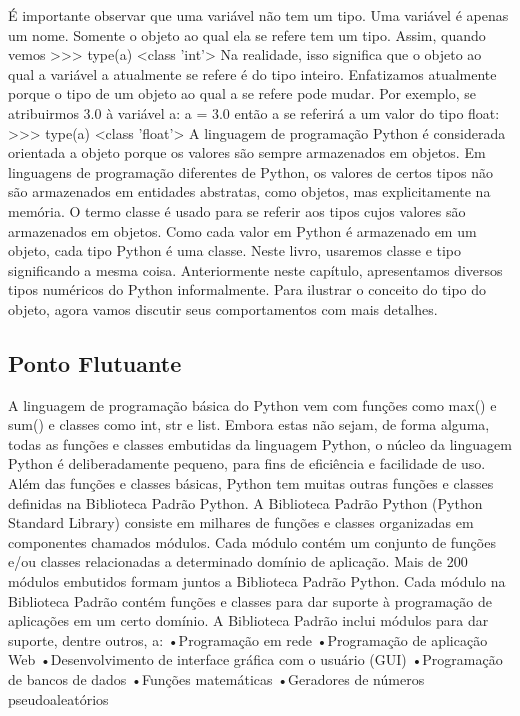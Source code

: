 			É importante observar que uma variável não tem um tipo. Uma variável é apenas
			um nome. Somente o objeto ao qual ela se refere tem um tipo. Assim, quando
			vemos
			>>> type(a)
			<class 'int'>
			Na realidade, isso significa que o objeto ao qual a variável a atualmente se refere
			é do tipo inteiro.
			Enfatizamos atualmente porque o tipo de um objeto ao qual a se refere pode
			mudar. Por exemplo, se atribuirmos 3.0 à variável a:
			a = 3.0
			então a se referirá a um valor do tipo float:
			>>> type(a)
			<class 'float'>
			A linguagem de programação Python é considerada orientada a objeto porque os valores são
			sempre armazenados em objetos. Em linguagens de programação diferentes de Python, os valores
			de certos tipos não são armazenados em entidades abstratas, como objetos, mas explicitamente na
			memória. O termo classe é usado para se referir aos tipos cujos valores são armazenados em
			objetos. Como cada valor em Python é armazenado em um objeto, cada tipo Python é uma classe.
			Neste livro, usaremos classe e tipo significando a mesma coisa.
			Anteriormente neste capítulo, apresentamos diversos tipos numéricos do Python
			informalmente. Para ilustrar o conceito do tipo do objeto, agora vamos discutir seus
			comportamentos com mais detalhes.
			
			\subsection{Ponto Flutuante}
			A linguagem de programação básica do Python vem com funções como max() e sum() e
			classes como int, str e list. Embora estas não sejam, de forma alguma, todas as funções e
			classes embutidas da linguagem Python, o núcleo da linguagem Python é deliberadamente
			pequeno, para fins de eficiência e facilidade de uso. Além das funções e classes básicas, Python
			tem muitas outras funções e classes definidas na Biblioteca Padrão Python. A Biblioteca Padrão
			Python (Python Standard Library) consiste em milhares de funções e classes organizadas em
			componentes chamados módulos.
			Cada módulo contém um conjunto de funções e/ou classes relacionadas a determinado
			domínio de aplicação. Mais de 200 módulos embutidos formam juntos a Biblioteca Padrão Python.
			Cada módulo na Biblioteca Padrão contém funções e classes para dar suporte à programação de
			aplicações em um certo domínio. A Biblioteca Padrão inclui módulos para dar suporte, dentre
			outros, a:
			•Programação em rede
			•Programação de aplicação Web
			•Desenvolvimento de interface gráfica com o usuário (GUI)
			•Programação de bancos de dados
			•Funções matemáticas
			•Geradores de números pseudoaleatórios
			
